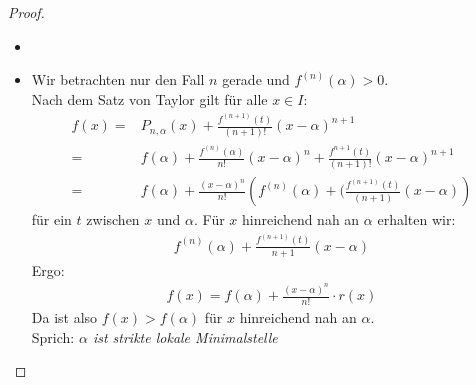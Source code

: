 \begin{proof}
	\begin{itemize}
		\item[ ]
			\item Wir betrachten nur den Fall $n$ gerade und 
			$f^{(n)}(\alpha) > 0$.\\
			 Nach dem Satz von Taylor gilt für alle $x \in I$: 
			\begin{align*}
				f(x) = & P_{n, \alpha}(x) + \frac{f^{(n+1)}(t)}{(n+1)!}
				(x- \alpha)^{n+1} \\
				= & f(\alpha) + \frac{f^{(n)}(\alpha)}{n!}
				(x - \alpha)^n + \frac{f^{n+1}(t)}{(n+1)!}(x- \alpha)^{n+1} \\
				= & f(\alpha) + \frac{(x- \alpha)^n}{n!}\left( f^{(n)}(\alpha) 
				+ (\frac{f^{(n+1)}(t)}{(n+1)}(x-\alpha)\right)
			\end{align*}
			für ein $t$ zwischen $x$ und $\alpha$. Für $x$ hinreichend nah an $\alpha$ 
			erhalten wir: 
			\begin{align*}
				f^{(n)}(\alpha) + \frac{f^{(n+1)}(t)}{n+1}(x-\alpha)			
			\end{align*}
			Ergo:
			\begin{align*}
				f(x) = f(\alpha) + \frac{(x- \alpha)^n}{n!} \cdot r(x)
			\end{align*}
			Da ist also $f(x) > f(\alpha)$ für $x$ hinreichend nah an $\alpha$. \\
			Sprich: \textit{$\alpha$ ist strikte lokale Minimalstelle}
	\end{itemize}
\end{proof}